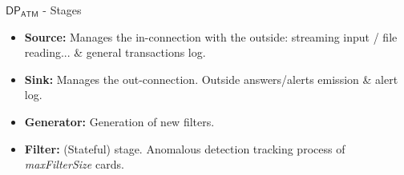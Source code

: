 
\begin{comment}
\begin{frame}{Continuous Query Engine: $\mathsf{DP_{ATM}}$}
    \begin{figure}
        \hspace*{-1cm} %
        \texttt{[image: figures/architecture.png]}
    \end{figure}
\end{frame}
\end{comment}

\begin{comment}
\begin{frame}{$\mathsf{DP_{ATM}}$ - Input Stream}
\textbf{Note}: 2 edges per transaction - the \emph{opening} edge and the \emph{closing} edge.

\begin{figure}
    \centering
    \only<1>{\texttt{[image: images/1-DataModel/2-edges-tx-tfm.png]}}
    \only<2>{\texttt{[image: images/1-DataModel/2-edges-tx-tfm-1.png]}}
    \caption{\only<1>{Opening edge}\only<2>{Closing edge}}
\end{figure}
\end{frame}
\end{comment}

\begin{frame}{$\mathsf{DP_{ATM}}$ - Stages}
    \begin{itemize}
        \item<1-> \textbf{Source:} Manages the in-connection with the outside: streaming input / file reading... \& general transactions log.
        \item<2-> \textbf{Sink:} Manages the out-connection. Outside answers/alerts emission \& alert log.
        \item<3-> \textbf{Generator:} Generation of new filters.
        \item<4-> \textbf{Filter:} (Stateful) stage. Anomalous detection tracking process of \emph{maxFilterSize} cards.
    \end{itemize}
    \begin{figure}
    \hspace*{-0.9cm}
    \centering
\end{figure}
\end{frame}


